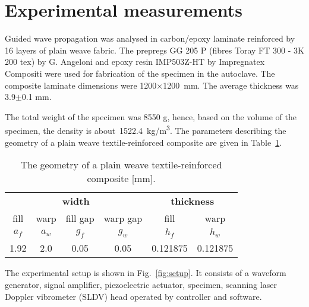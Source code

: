 \documentclass[preprint,12pt]{elsarticle}
\begin{document}
\section{Experimental measurements \label{sec:experiment}}
Guided wave propagation was analysed in carbon/epoxy laminate reinforced 
by 16 layers of plain weave fabric. The prepregs GG 205  P (fibres Toray FT 300 - 3K 
200 tex) by G. Angeloni and epoxy resin IMP503Z-HT by Impregnatex Compositi were 
used for fabrication of the specimen in the autoclave. The composite laminate 
dimensions were 1200\(\times\)1200~mm. The average thickness was 3.9\(\pm\)0.1 
mm. 

The total weight of the specimen was 8550 g, hence, based on the volume of the specimen, the density is about~1522.4~kg/m\textsuperscript{3}.
The parameters describing the geometry of a plain weave textile-reinforced composite are given in Table~\ref{tab:weave_geo}. 
 \begin{table}[h]
	\renewcommand{\arraystretch}{1.3}
	\centering \footnotesize
	\caption{The geometry of a plain weave textile-reinforced composite [mm].}
	\begin{tabular}{cccccc} 
		\toprule
		\multicolumn{4}{c}{\textbf{width} }	& \multicolumn{2}{c}{\textbf{thickness} }  \\ 
	    \cmidrule(lr){1-4} \cmidrule(lr){5-6} 
		fill & warp & fill gap& warp gap& fill & warp\\
		\(a_f\) &\(a_w\)& \(g_f\)  & \(g_w\)  & \(h_f\)& \(h_w\) \\ 
		\cmidrule(lr){1-2} \cmidrule(lr){3-4} \cmidrule(lr){5-6}
		1.92 &2.0& 0.05& 0.05 & 0.121875 & 0.121875 \\
		\bottomrule 
	\end{tabular} 
	\label{tab:weave_geo}
\end{table}

The experimental setup is shown in Fig.~\ref{fig:setup}. 
It consists of a waveform generator, signal amplifier, piezoelectric actuator, specimen, scanning laser Doppler vibrometer (SLDV) head operated by controller and software.
\end{document}
